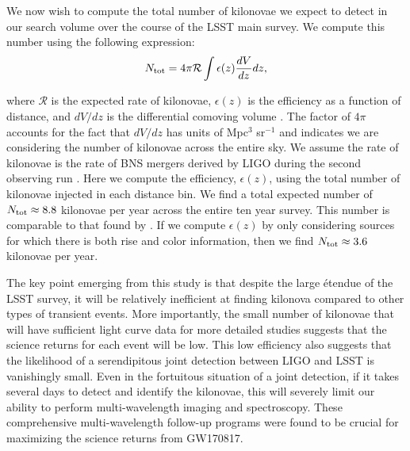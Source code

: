 
We now wish to compute the total number of kilonovae we expect to detect in our search volume over the course of the LSST main survey. We compute this number using the following expression:
\begin{equation}
N_{\rm tot} = 4 \pi \mathcal{R} \int \epsilon (z) \frac{dV}{dz} dz,
\end{equation}

\noindent where $\mathcal{R}$ is the expected rate of kilonovae, $\epsilon (z)$ is the efficiency as a function of distance, and $dV/dz$ is the differential comoving volume \citep[see e.g.,][]{Hogg1999}. The factor of $4\pi$ accounts for the fact that $dV/dz$ has units of Mpc$^{3}$ sr$^{-1}$ and indicates we are considering the number of kilonovae across the entire sky. We assume the rate of kilonovae is the rate of BNS mergers derived by LIGO during the second observing run \citep[$\mathcal{R} \apx1500$~Mpc$^{-3}$~yr$^{-1}$,][]{LIGOGW170817}. Here we compute the efficiency, $\epsilon (z)$, using the total number of kilonovae injected in each distance bin. We find a total expected number of $N_{\rm tot} \approx 8.8$ kilonovae per year across the entire ten year survey. This number is comparable to that found by \citet{Scolnic+18}. If we compute $\epsilon (z)$ by only considering sources for which there is both rise and color information, then we find $N_{\rm tot} \approx 3.6$ kilonovae per year.

The key point emerging from this study is that despite the large \'{e}tendue of the LSST survey, it will be relatively inefficient at finding kilonova compared to other types of transient events. More importantly, the small number of kilonovae that will have sufficient light curve data for more detailed studies suggests that the science returns for each event will be low. This low efficiency also suggests that the likelihood of a serendipitous joint detection between LIGO and LSST is vanishingly small. Even in the fortuitous situation of a joint detection, if it takes several days to detect and identify the kilonovae, this will severely limit our ability to perform multi-wavelength imaging and spectroscopy. These comprehensive multi-wavelength follow-up programs were found to be crucial for maximizing the science returns from GW170817.

